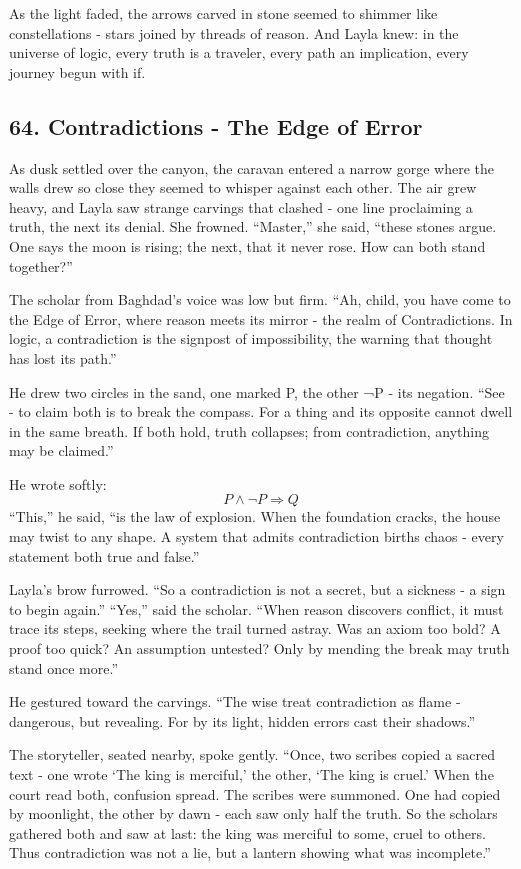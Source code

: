 \documentclass[
  letterpaper,
  DIV=11,
  numbers=noendperiod]{scrreprt}
\begin{document}
As the light faded, the arrows carved in stone seemed to shimmer like
constellations - stars joined by threads of reason. And Layla knew: in
the universe of logic, every truth is a traveler, every path an
implication, every journey begun with if.

\subsection{64. Contradictions - The Edge of
Error}\label{contradictions---the-edge-of-error}

As dusk settled over the canyon, the caravan entered a narrow gorge
where the walls drew so close they seemed to whisper against each other.
The air grew heavy, and Layla saw strange carvings that clashed - one
line proclaiming a truth, the next its denial. She frowned. ``Master,''
she said, ``these stones argue. One says the moon is rising; the next,
that it never rose. How can both stand together?''

The scholar from Baghdad's voice was low but firm. ``Ah, child, you have
come to the Edge of Error, where reason meets its mirror - the realm of
Contradictions. In logic, a contradiction is the signpost of
impossibility, the warning that thought has lost its path.''

He drew two circles in the sand, one marked P, the other ¬P - its
negation. ``See - to claim both is to break the compass. For a thing and
its opposite cannot dwell in the same breath. If both hold, truth
collapses; from contradiction, anything may be claimed.''

He wrote softly: \[
P \land \neg P \Rightarrow Q
\] ``This,'' he said, ``is the law of explosion. When the foundation
cracks, the house may twist to any shape. A system that admits
contradiction births chaos - every statement both true and false.''

Layla's brow furrowed. ``So a contradiction is not a secret, but a
sickness - a sign to begin again.'' ``Yes,'' said the scholar. ``When
reason discovers conflict, it must trace its steps, seeking where the
trail turned astray. Was an axiom too bold? A proof too quick? An
assumption untested? Only by mending the break may truth stand once
more.''

He gestured toward the carvings. ``The wise treat contradiction as flame
- dangerous, but revealing. For by its light, hidden errors cast their
shadows.''

The storyteller, seated nearby, spoke gently. ``Once, two scribes copied
a sacred text - one wrote `The king is merciful,' the other, `The king
is cruel.' When the court read both, confusion spread. The scribes were
summoned. One had copied by moonlight, the other by dawn - each saw only
half the truth. So the scholars gathered both and saw at last: the king
was merciful to some, cruel to others. Thus contradiction was not a lie,
but a lantern showing what was incomplete.''
\end{document}
